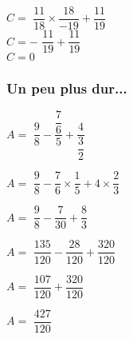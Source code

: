 $ C = ${  $\dfrac{11}{18} \times \dfrac{18}{-19} + \dfrac{11}{19} $} \\

$ C = - ${  $\dfrac{11}{19} + \dfrac{11}{19} $ }\\

$ C = 0 $ \\

\newpage

\subsubsection{Un peu plus dur...}

\begin{minipage}{0.29\textwidth}
$ A = ${  $\dfrac{9}{8} - \dfrac{\dfrac{7}{6}}{5} + \dfrac{4}{\dfrac{3}{2}} $ }\\

\vspace{.5cm}

$ A = ${  $\dfrac{9}{8} - \dfrac{7}{6} \times \dfrac{1}{5} + 4 \times \dfrac{2}{3} $} \\

\vspace{.5cm}

$ A = ${  $\dfrac{9}{8} - \dfrac{7}{30} + \dfrac{8}{3} $ }\\

\vspace{.5cm}

$ A = ${  $\dfrac{135}{120} - \dfrac{28}{120} + \dfrac{320}{120} $} \\

\vspace{.5cm}

$ A = ${  $\dfrac{107}{120} + \dfrac{320}{120} $ }\\

\vspace{.5cm}

$ A = ${  $\dfrac{427}{120} $ }
\end{minipage}

